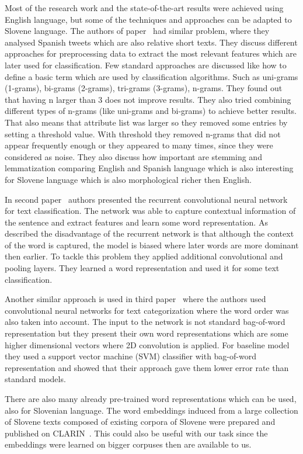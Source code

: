 \documentclass[11pt,a4paper]{article}
\begin{document}
Most of the research work and the state-of-the-art results were achieved using English language, but some of the techniques and approaches can be adapted to Slovene language.
The authors of paper~\cite{articleSpanish} had similar problem, where they analysed Spanish tweets which are also relative short texts.
They discuss different approaches for preprocessing data to extract the most relevant features which are later used for classification.
Few standard approaches are discussed like how to define a basic term which are used by classification algorithms.
Such as uni-grams (1-grams), bi-grams (2-grams), tri-grams (3-grams), n-grams.
They found out that having n larger than 3 does not improve results.
They also tried combining different types of n-grams (like uni-grams and bi-grams) to achieve better results.
That also means that attribute list was larger so they removed some entries by setting a threshold value.
With threshold they removed n-grams that did not appear frequently enough or they appeared to many times, since they were considered as noise.
They also discuss how important are stemming and lemmatization comparing English and Spanish language which is also interesting for Slovene language which is also morphological richer then English.

In second paper~\cite{article2} authors presented the recurrent convolutional neural network for text classification.
The network was able to capture contextual information of the sentence and extract features and learn some word representation.
As described the disadvantage of the recurrent network is that although the context of the word is captured, the model is biased where later words are more dominant then earlier.
To tackle this problem they applied additional convolutional and pooling layers.
They learned a word representation and used it for some text classification.

Another similar approach is used in third paper~\cite{article3} where the authors used convolutional neural networks for text categorization where the word order was also taken into account.
The input to the network is not standard bag-of-word representation but they present their own word representations which are some higher dimensional vectors where 2D convolution is applied.
For baseline model they used a support vector machine (SVM) classifier with bag-of-word representation and showed that their approach gave them lower error rate than standard models.

There are also many already pre-trained word representations which can be used, also for Slovenian language.
The word embeddings induced from a large collection of Slovene texts composed of existing corpora of Slovene were prepared and published on CLARIN~\cite{embeddings}.
This could also be useful with our task since the embeddings were learned on bigger corpuses then are available to us.
\end{document}
